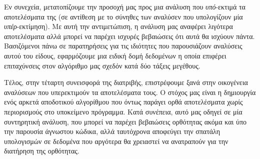 Εν συνεχεία, μετατοπίζουμε την προσοχή μας προς μια ανάλυση που \emph{υπό}-εκτιμά τα αποτελέσματα της (σε αντίθεση με το σύνηθες των αναλύσεν που υπολογίζουν μία \emph{υπέρ}-εκτίμηση). Με αυτή την αντιμετώπιση, η ανάλυση μας αναφέρει λιγότερα αποτελέσματα αλλά μπορεί να παρέχει ισχυρές βεβαιώσεις ότι αυτά θα ισχύουν πάντα. Βασιζόμενοι πάνω σε παρατηρήσεις για τις ιδιότητες που παρουσιάζουν αναλύσεις αυτού του είδους, εφαρμόζουμε μια ειδική δομή δεδομένων η οποία επιφέρει επιταχύνσεις στον αλγόριθμο μας σχεδόν κατά δύο τάξεις μεγέθους.

Τέλος, στην τέταρτη συνεισφορά της διατριβής, επιστρέφουμε ξανά στην οικογένεια αναλύσεων που υπερεκτιμούν τα αποτελέσματα τους. Ο στόχος μας είναι η δημιουργία ενός αρκετά αποδοτικού αλγορίθμου που όντως παράγει ορθά αποτελέσματα χωρίς περιορισμούς στο υποκείμενο πρόγραμμα. Κατά συνέπεια, αυτό μας οδηγεί σε μία συντηρητική ανάλυση, που μπορεί να παρέχει βεβαιώσεις ορθότητας ακόμα και ύπο την παρουσία άγνωστου κώδικα, αλλά ταυτόχρονα αποφεύγει την σπατάλη υπολογισμών σε δεδομένα που αργότερα θα χρειαστεί να ανατραπούν για την διατήρηση της ορθότητας.
